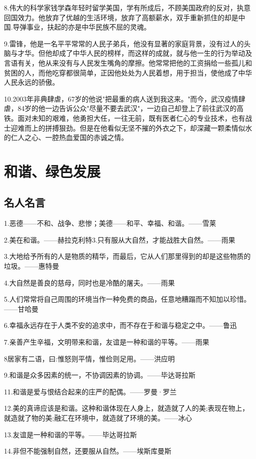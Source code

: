\documentclass[UTF8]{ctexart}
\begin{document}
8.伟大的科学家钱学森年轻时留学美国，学有所成后，不顾美国政府的反对，执意回国效力。他放弃了优越的生活环境，放弃了高额薪水，双手重新抓住的却是中国.导弹事业，扶起的亦是中华民族不屈的灵魂。\par
9.雷锋，他是一名平平常常的人民子弟兵，他没有显著的家庭背景，没有过人的头脑与才华。但他却成了中华人民的榜样，而这样的成就，就与他一生的行为举动及言语有关，他从来没有与人民发生嘴角的摩擦。他常常把他的工资捐给一些孤儿和贫困的人，而他吃穿都很简单，正因他处处为人民着想，用于担当，使他成了中华人民永远的骄傲。\par
10.2003年非典肆虐，67岁的他说"把最重的病人送到我这来。"而今，武汉疫情肆虐，84岁的他一边告诉公众"尽量不要去武汉"，一边自己却登上了前往武汉的高铁。面对未知的艰难，他勇担大任，一往无前，既有医者仁心的专业技术，也有战士迎难而上的拼搏狠劲。但是在他看似无坚不摧的外衣之下，却深藏一颗柔情似水的仁人之心、一腔热血爱国的赤诚之情。\par
\newpage
\section{和谐、绿色发展}
\subsection{名人名言}
1.恶德——不和、战争、悲惨；美德——和平、幸福、和谐。——雪莱\par
2.美在和谐。——赫拉克利特3.只有服从大自然，才能战胜大自然。——雨果\par
3.大地给予所有的人是物质的精华，而最后，它从人们那里得到的却是这些物质的垃圾。——惠特曼\par
4.大自然是善良的慈母，同时也是冷酷的屠夫。——雨果\par
5.人们常常将自己周围的环境当作一种免费的商品，任意地糟蹋而不知加以珍惜。——甘哈曼\par
6.幸福永远存在于人类不安的追求中，而不存在于和谐与稳定之中。——鲁迅\par
7.亲善产生辛福，文明带来和谐，友谊是一种和谐的平等。——雨果\par
8居家有二语，曰:惟怒则平情，惟俭则足用。——洪应明\par
9.和谐是众多因素的统⼀，不协调因素的协调。——毕达哥拉斯\par
11.和谐是爱与恨结合起来的庄严的配偶。——罗曼·罗兰\par
12.美的真谛应该是和谐。这种和谐体现在人身上，就造就了人的美;表现在物上，就造就了物的美;融汇在环境中，就造就了环境的美。——冰心\par
13.友谊是一种和谐的平等。——毕达哥拉斯\par
14.非但不能强制自然，还要服从自然。——埃斯库曼斯\par
\end{document}

